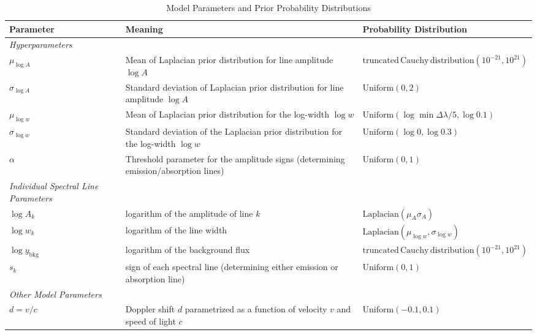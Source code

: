 \documentclass[12pt]{emulateapj}
\newcommand{\counts}{y}
\begin{document}
\begin{table*}[hbtp]
\renewcommand{\arraystretch}{1.3}
\footnotesize
\caption{Model Parameters and Prior Probability Distributions}
\begin{threeparttable} 
\begin{tabularx}{\textwidth}{p{4.0cm}p{7.0cm}X}%
\toprule
\bf{Parameter} & \bf{Meaning} & \bf{Probability Distribution} \\ \midrule
\it{Hyperparameters} && \\ \midrule
$\mu_{\log{A}}$ & Mean of Laplacian prior distribution for line amplitude $\log{A}$ &   $\mathrm{truncated\, Cauchy\, distribution}(10^{-21}, 10^{21})$  \\
$\sigma_{\log{A}}$ & Standard deviation of Laplacian prior distribution for line amplitude $\log{A}$ & $\mathrm{Uniform}(0,2)$ \\
$\mu_{\log{w}}$ & Mean of Laplacian prior distribution for the log-width $\log{w}$ & $\mathrm{Uniform}(\log{\min{\Delta\lambda}/5}, \log{0.1})$  \\
$\sigma_{\log{w}}$ & Standard deviation of the Laplacian prior distribution for the log-width $\log{w}$ & $\mathrm{Uniform}(\log{0}, \log{0.3})$\\ 
$\alpha$ & Threshold parameter for the amplitude signs (determining emission/absorption lines) &  $\mathrm{Uniform}(0,1)$\\
\midrule
\it{Individual Spectral Line Parameters} && \\ \midrule
$\log{A_k}$ & logarithm of the amplitude of line $k$ & $\mathrm{Laplacian}(\mu_A \sigma_A)$ \\
$\log{w_k}$ & logarithm of the line width & $\mathrm{Laplacian}(\mu_{\log{w}}, \sigma_{\log{w}})$ \\
$\log{\counts}_{\mathrm{bkg}}$ & logarithm of the background flux & $\mathrm{truncated\, Cauchy\, distribution}(10^{-21}, 10^{21})$ \\
$s_k$ & sign of each spectral line (determining either emission or absorption line) &  $\mathrm{Uniform}(0,1)$\\
\midrule
\it{Other Model Parameters} && \\ \midrule
$d = v/c$ & Doppler shift $d$ parametrized as a function of velocity $v$ and speed of light $c$ & $\mathrm{Uniform}(-0.1, 0.1)$ \\

\end{tabularx}
\end{threeparttable}
\end{table*}
\end{document}
